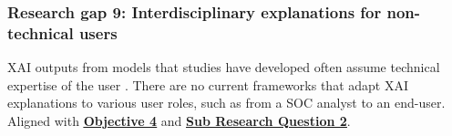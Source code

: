 
\subsubsection*{Research gap 9: Interdisciplinary explanations for non-technical users}\label{research-gap-9}
XAI outputs from models that studies have developed often assume technical expertise of the user \citep{greco2023explaining}. There are no current frameworks that adapt XAI explanations to various user roles, such as from a SOC analyst to an end-user. Aligned with \hyperref[objective-4]{\uline{\textbf{Objective 4}}} and \hyperref[sub-research-q2]{\uline{\textbf{Sub Research Question 2}}}.
